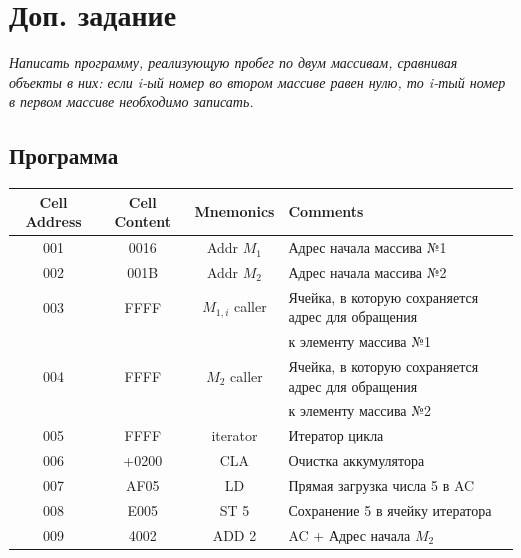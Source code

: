 \section{Доп. задание}
\textit{
Написать программу, реализующую пробег по двум массивам, сравнивая объекты в них: если i-ый номер во втором массиве
равен нулю, то i-тый номер в первом массиве необходимо записать.}

\subsection{Программа}
\begin{center}
    \begin{tabular}{|c|c|c|l|}
        \hline
        \textbf{Cell Address} & \textbf{Cell Content} & \textbf{Mnemonics} & \textbf{Comments}                                 \\
        \hline
        001                   & 0016                  & Addr $M_{1}$       & Адрес начала массива №1                           \\
        002                   & 001B                  & Addr $M_{2}$      & Адрес начала массива №2                           \\
        003                   & FFFF                  & $M_{1,i}$ caller   & Ячейка, в которую сохраняется адрес для обращения \\
        &                       &                    & к элементу массива №1                             \\
        004                   & FFFF                  & $M_{2}$ caller     & Ячейка, в которую сохраняется адрес для обращения \\
        &                       &                    & к элементу массива №2                             \\
        005                   & FFFF                  & iterator           & Итератор цикла                                    \\
        006                   & +0200                 & CLA                & Очистка аккумулятора                              \\
        007                   & AF05                  & LD #5              & Прямая загрузка числа 5 в AC                      \\
        008                   & E005                  & ST 5               & Сохранение 5 в ячейку итератора                   \\
        009                   & 4002                  & ADD 2              & AC + Адрес начала $M_{2}$                           \\

\end{tabular}
\end{center}
